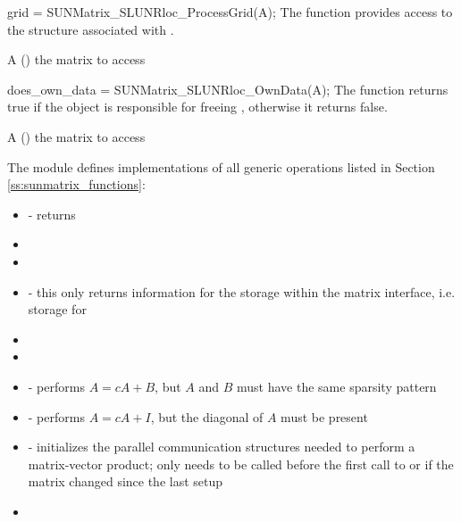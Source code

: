 {
  grid = SUNMatrix\_SLUNRloc\_ProcessGrid(A);
}
{
  The function  provides access
  to the {\superludist}  structure associated with .
}
{
  \begin{args}
  \item[A] () the matrix to access
  \end{args}
}
{
}
{
}

{
  does\_own\_data = SUNMatrix\_SLUNRloc\_OwnData(A);
}
{
  The function  returns true if the 
  object is responsible for freeing , otherwise it returns false.
}
{
  \begin{args}
  \item[A] () the matrix to access
  \end{args}
}
{
}
{
}

The {\sunmatslunrloc} module defines implementations of all generic  operations
listed in Section \ref{ss:sunmatrix_functions}:

\begin{itemize}
  \item {} - returns 
  \item {}
  \item {}
  \item {} - this only returns information for the storage within the
    matrix interface, i.e. storage for 
  \item {}
  \item {}
  \item {} - performs $A = cA + B$, but $A$ and $B$ must have the same sparsity pattern 
  \item {} - performs $A = cA + I$, but the diagonal of $A$ must be present
  \item {} - initializes the {\superludist} parallel communication
    structures needed to perform a matrix-vector product; only needs to be called before the
    first call to  or if the matrix changed since the last setup
  \item {}
\end{itemize}


